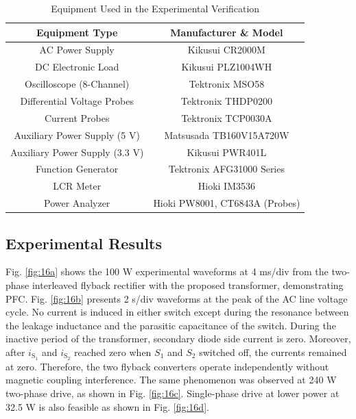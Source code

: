 \documentclass[lettersize,journal]{IEEEtran}
\begin{document}
\begin{table}[b!] %
    \caption{Equipment Used in the Experimental Verification}
    \centering
    \footnotesize
    \setlength{\tabcolsep}{3pt}
    \begin{tabular}{cc}
        \hline
        \textbf{Equipment Type} & \textbf{Manufacturer \& Model} \\
        \hline \hline
        AC Power Supply & Kikusui CR2000M \\
        DC Electronic Load & Kikusui PLZ1004WH \\
        Oscilloscope (8-Channel) & Tektronix MSO58 \\
        Differential Voltage Probes & Tektronix THDP0200 \\
        Current Probes & Tektronix TCP0030A \\
        Auxiliary Power Supply (5 V) & Matsusada TB160V15A720W \\
        Auxiliary Power Supply (3.3 V) & Kikusui PWR401L \\
        Function Generator & Tektronix AFG31000 Series \\
        LCR Meter & Hioki IM3536 \\
        Power Analyzer & Hioki PW8001,  CT6843A (Probes)  \\
        \hline
    \end{tabular}
    \label{tab:equipment}
\end{table}

\subsection{Experimental Results}
Fig. \ref{fig:16a} shows the 100 W experimental waveforms at 4 ms/div from the two-phase interleaved flyback rectifier with the proposed transformer, demonstrating PFC. Fig. \ref{fig:16b} presents 2 \textmu s/div waveforms at the peak of the AC line voltage cycle. No current is induced in either switch except during the resonance between the leakage inductance and the parasitic capacitance of the switch. During the inactive period of the transformer, secondary diode side current is zero. Moreover, after $i_{\mathrm{S}_1}$ and $i_{\mathrm{S}_2}$ reached zero when $S_1$ and $S_2$ switched off, the currents remained at zero. Therefore, the two flyback converters operate independently without magnetic coupling interference. The same phenomenon was observed at 240 W two-phase drive, as shown in Fig. \ref{fig:16c}. Single-phase drive at lower power at 32.5 W is also feasible as shown in Fig. \ref{fig:16d}.
\end{document}
